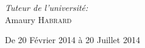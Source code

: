 \begin{titlepage}
\begin{center}
\begin{minipage}[t]{0.6\textwidth}
\begin{flushright}
    
    \emph{Tuteur de l'université:} \\
        Amaury \textsc{Habrard} \\
  \end{flushright}
\end{minipage}

\vfill

{\large De 20 Février 2014 à 20 Juillet 2014}

\end{center}

\end{titlepage}
